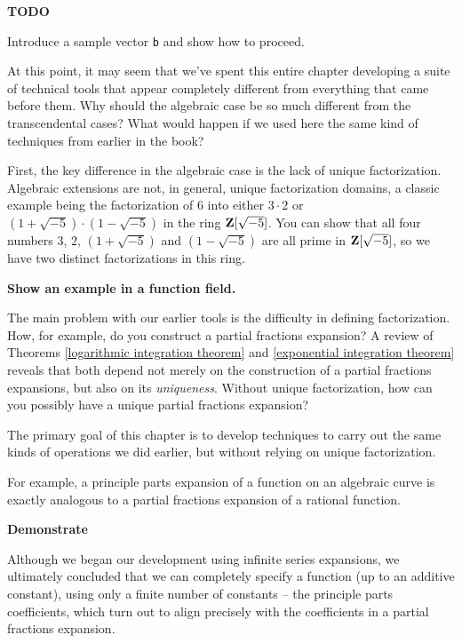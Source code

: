 {\bf TODO}

Introduce a sample vector {\tt b} and show how to proceed.

\endexample


At this point, it may seem that we've spent this entire chapter
developing a suite of technical tools that appear completely different
from everything that came before them.  Why should the algebraic case
be so much different from the transcendental cases?  What would happen
if we used here the same kind of techniques from earlier in the book?

First, the key difference in the algebraic case is the lack of unique
factorization.  Algebraic extensions are not, in general, unique
factorization domains, a classic example being the factorization of
$6$ into either $3\cdot 2$ or $(1+\sqrt{-5})\cdot(1-\sqrt{-5})$ in the
ring $\mathbf{Z}[\sqrt{-5}]$.  You can show that all four numbers $3$, $2$,
$(1+\sqrt{-5})$ and $(1-\sqrt{-5})$ are all prime in $\mathbf{Z}[\sqrt{-5}]$,
so we have two distinct factorizations in this ring.

{\bf Show an example in a function field.}

The main problem with our earlier tools is the difficulty in defining
factorization.  How, for example, do you construct a partial fractions
expansion?  A review of Theorems \ref{logarithmic integration theorem}
and \ref{exponential integration theorem} reveals that both depend
not merely on the construction of a partial fractions expansions, but
also on its {\it uniqueness}.  Without unique factorization, how can
you possibly have a unique partial fractions expansion?

The primary goal of this chapter is to develop techniques to carry
out the same kinds of operations we did earlier, but without relying
on unique factorization.

For example, a principle parts expansion of a function on an algebraic
curve is exactly analogous to a partial fractions expansion of a
rational function.

{\bf Demonstrate}

Although we began our development using infinite series expansions, we
ultimately concluded that we can completely specify a function (up to
an additive constant), using only a finite number of constants -- the
principle parts coefficients, which turn out to align precisely with
the coefficients in a partial fractions expansion.


